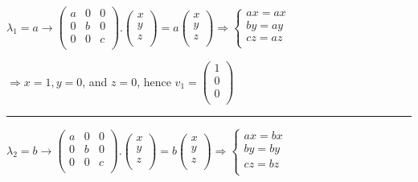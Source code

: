 \documentclass[fleqn]{article}
\begin{document}
\begin{enumerate}
      \textcolor{hwColor}{
        $
        \lambda_1=a \rightarrow 
        \begin{pmatrix}
          a & 0 & 0 \\
          0 & b & 0 \\
          0 & 0 & c \\
        \end{pmatrix}.\begin{pmatrix}
          x \\
          y \\
          z \\
        \end{pmatrix}=a\begin{pmatrix}
          x \\
          y \\
          z \\
        \end{pmatrix} 
        \Longrightarrow 
        \begin{cases}
          ax=ax \\
          by=ay \\
          cz=az \\
        \end{cases}
        $
      }

      \textcolor{hwColor}{
        $
        \Longrightarrow 
        x=1, y=0$, and $z=0$, hence $v_1=\begin{pmatrix}
          1 \\
          0 \\
          0 \\
        \end{pmatrix}
        $
      }

      \textcolor{hwColor}{
        \rule{16cm}{0.4pt}
      }

      \textcolor{hwColor}{
        $
        \lambda_2=b \rightarrow 
        \begin{pmatrix}
          a & 0 & 0 \\
          0 & b & 0 \\
          0 & 0 & c \\
        \end{pmatrix}.\begin{pmatrix}
          x \\
          y \\
          z \\
        \end{pmatrix}=b\begin{pmatrix}
          x \\
          y \\
          z \\
        \end{pmatrix} 
        \Longrightarrow 
        \begin{cases}
          ax=bx \\
          by=by \\
          cz=bz \\
        \end{cases}
        $
      }


\end{enumerate}
\end{document}
